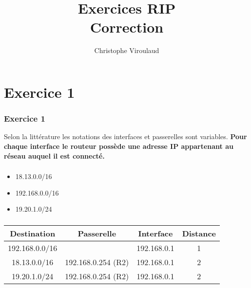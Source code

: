 \documentclass[svgnames,11pt]{beamer}
\author[]{Christophe Viroulaud}
\title{Exercices RIP\\Correction}
\date{\framebox{\textbf{Archi 12}}}
\institute{Terminale - NSI}
\begin{document}
\begin{frame}
\titlepage
\end{frame}
\section{Exercice 1}
\begin{frame}
    \frametitle{Exercice 1}
    \begin{aretenir}[Remarque]
        Selon la littérature les notations des interfaces et passerelles sont variables. \textbf{Pour chaque interface le routeur possède une adresse IP appartenant au réseau auquel il est connecté.}
    \end{aretenir}
    

\end{frame}
\begin{frame}
    \frametitle{}

    \begin{itemize}
        \item 18.13.0.0/16
        \item 192.168.0.0/16
        \item 19.20.1.0/24
    \end{itemize}

\end{frame}
\begin{frame}
    \frametitle{}

        \begin{center}
            \begin{tabular}{|*{4}{c|}}
                \hline
                Destination & Passerelle & Interface & Distance \\
                \hline
                192.168.0.0/16 & & 192.168.0.1 & 1\\
                \hline
                18.13.0.0/16 & 192.168.0.254 (R2) & 192.168.0.1 & 2\\
                \hline
                19.20.1.0/24 & 192.168.0.254 (R2) & 192.168.0.1 & 2\\
                \hline
            \end{tabular}
        \end{center}

\end{frame}
\end{document}
